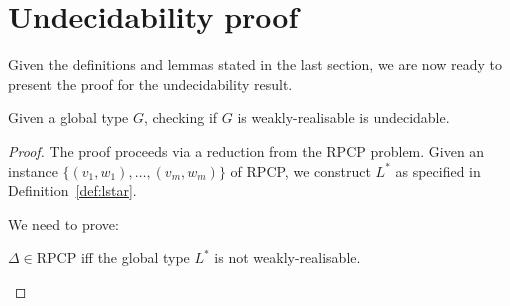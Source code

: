 \section{Undecidability proof}

Given the definitions and lemmas stated in the last section, we are now ready
to present the proof for the undecidability result.

\bigskip

\begin{theorem}\label{thm:main}
	Given a global type $G$, checking if $G$ is weakly-realisable is undecidable.
\end{theorem}

\begin{proof}
	The proof proceeds via a reduction from the RPCP problem.
	Given an instance $\{(v_1, w_1), \ldots, (v_m, w_m)\}$ of RPCP, we
	construct $L^*$ as specified in Definition~\ref{def:lstar}.
	
	We need to prove:
	\begin{center}
		$\Delta \in \text{RPCP}$ iff the global type $L^*$ is not weakly-realisable.
	\end{center}


\end{proof}
